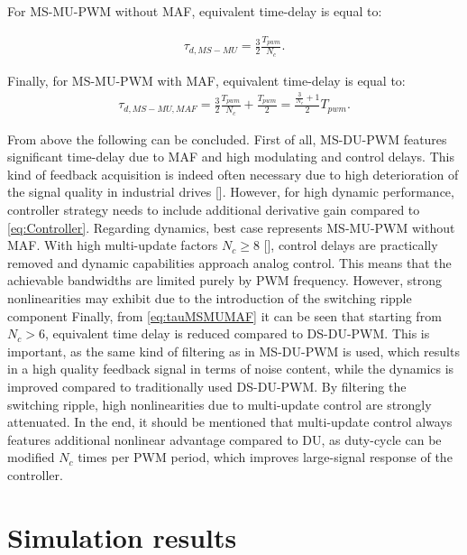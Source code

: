 \documentclass[journal]{IEEEtran}
\begin{document}
For MS-MU-PWM without MAF, equivalent time-delay is equal to:

\begin{equation}
\begin{aligned}
\tau_{d,MS-MU} = \frac{3}{2} \frac{T_{pwm}}{N_c}.
\label{eq:tauMSMU} 
\end{aligned}    
\end{equation}

Finally, for MS-MU-PWM with MAF, equivalent time-delay is equal to:
\begin{equation}
\begin{aligned}
\tau_{d,MS-MU,MAF} = \frac{3}{2} \frac{T_{pwm}}{N_c} + \frac{T_{pwm}}{2} = \frac{\frac{3}{N_c}+1}{2}T_{pwm}.
\label{eq:tauMSMUMAF} 
\end{aligned}    
\end{equation}

From above the following can be concluded. First of all, MS-DU-PWM features significant time-delay due to MAF and high modulating and control delays. This kind of feedback acquisition is indeed often necessary due to high deterioration of the signal quality in industrial drives []. However, for high dynamic performance, controller strategy needs to include additional derivative gain compared to \eqref{eq:Controller}. Regarding dynamics, best case represents MS-MU-PWM without MAF. With high multi-update factors $N_c \geq 8$ [], control delays are practically removed and dynamic capabilities approach analog control. This means that the achievable bandwidths are limited purely by PWM frequency. However, strong nonlinearities may exhibit due to the introduction of the switching ripple component 
Finally, from \eqref{eq:tauMSMUMAF} it can be seen that starting from $N_c>6$, equivalent time delay is reduced compared to DS-DU-PWM. This is important, as the same kind of filtering as in MS-DU-PWM is used, which results in a high quality feedback signal in terms of noise content, while the dynamics is improved compared to traditionally used DS-DU-PWM. By filtering the switching ripple, high nonlinearities due to multi-update control are strongly attenuated. 
In the end, it should be mentioned that multi-update control always features additional nonlinear advantage compared to DU, as duty-cycle can be modified $N_c$ times per PWM period, which improves large-signal response of the controller. 


\section{Simulation results}
\end{document}

